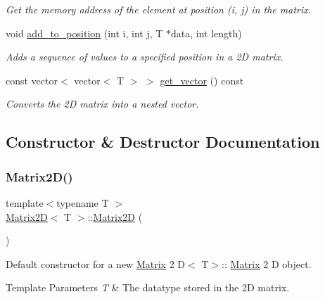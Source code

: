 \begin{DoxyCompactItemize}
\begin{DoxyCompactList}\small\item\em Get the memory address of the element at position (i, j) in the matrix. \end{DoxyCompactList}\item 
void \mbox{\hyperlink{classMatrix2D_a2bd34bc1808af36aa3dce5af143ce304}{add\+\_\+to\+\_\+position}} (int i, int j, T $\ast$data, int length)
\begin{DoxyCompactList}\small\item\em Adds a sequence of values to a specified position in a 2D matrix. \end{DoxyCompactList}\item 
const vector$<$ vector$<$ T $>$ $>$ \mbox{\hyperlink{classMatrix2D_a2cd319270ca890e47dad636b9af34a11}{get\+\_\+vector}} () const
\begin{DoxyCompactList}\small\item\em Converts the 2D matrix into a nested vector. \end{DoxyCompactList}\end{DoxyCompactItemize}


\subsection{Constructor \& Destructor Documentation}
\mbox{\label{classMatrix2D_a950bb2aa76c86e057d91f430d5a27b57}} 
\subsubsection{\texorpdfstring{Matrix2\+D()}{Matrix2D()}\hspace{0.1cm}{\footnotesize\ttfamily [1/3]}}
{\footnotesize\ttfamily template$<$typename T $>$ \\
\mbox{\hyperlink{classMatrix2D}{Matrix2D}}$<$ T $>$\+::\mbox{\hyperlink{classMatrix2D}{Matrix2D}} (\begin{DoxyParamCaption}{ }\end{DoxyParamCaption})}



Default constructor for a new \mbox{\hyperlink{classMatrix}{Matrix}} 2 D$<$ T$>$\+:\+: \mbox{\hyperlink{classMatrix}{Matrix}} 2 D object. 


\begin{DoxyTemplParams}{Template Parameters}
{\em T} & The datatype stored in the 2D matrix. \\
\hline
\end{DoxyTemplParams}
\mbox{\label{classMatrix2D_ac93acc71341e612cf8b23d4308c561f8}} 
